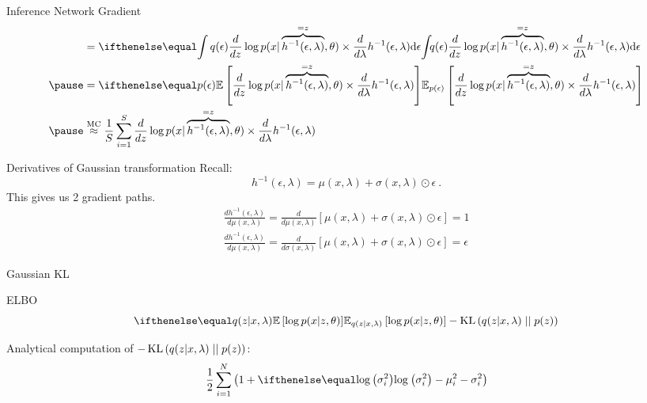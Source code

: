 \documentclass[14pt]{beamer}
\begin{document}
\begin{frame}{Inference Network Gradient}
\begin{equation*}
\begin{aligned}
&= \intl{q(\epsilon) \frac{d}{dz} \log p(x| \overbrace{h^{-1}(\epsilon, \lambda)}^{=z}, \theta) \times \frac{d}{d\lambda} h^{-1}(\epsilon, \lambda)}{\epsilon}  \\ \pause
&= \E[p(\epsilon)]{\frac{d}{dz} \log p(x| \overbrace{h^{-1}(\epsilon, \lambda)}^{=z}, \theta)\times \frac{d}{d\lambda} h^{-1}(\epsilon, \lambda)}\\ \pause
&\overset{\text{MC}}{\approx} \frac{1}{S}\sum_{i=1}^{S} \frac{d}{dz} \log p(x| \overbrace{h^{-1}(\epsilon, \lambda)}^{=z}, \theta) \times \frac{d}{d\lambda} h^{-1}(\epsilon, \lambda)
\end{aligned}
\end{equation*}
\end{frame}

\begin{frame}{Derivatives of Gaussian transformation}
Recall:
$$ h^{-1}(\epsilon, \lambda) = \mu(x,\lambda) + \sigma(x,\lambda) \odot \epsilon \ . $$
\pause
This gives us 2 gradient paths.
\pause
\begin{align*}
\frac{d h^{-1}(\epsilon, \lambda)}{d\mu(x,\lambda)} = \frac{d}{d\mu(x,\lambda)}\left[ \mu(x,\lambda) + \sigma(x,\lambda) \odot \epsilon \right] = 1 \\
\frac{d h^{-1}(\epsilon, \lambda)}{d\mu(x,\lambda)} = \frac{d}{d\sigma(x,\lambda)}\left[ \mu(x,\lambda) + \sigma(x,\lambda) \odot \epsilon \right] = \epsilon
\end{align*}
\end{frame}

\begin{frame}{Gaussian KL}
\begin{block}{ELBO}
\begin{equation*}
\E[q(z|x,\lambda)]{\log p(x|z,\theta)} - \KL{q(z|x,\lambda)}{p(z)}
\end{equation*}
\end{block}
\pause
Analytical computation of $ -\operatorname{KL}\left(q(z|x,\lambda)\mid\mid p(z)\right) $:
\begin{equation*}
\frac{1}{2}\sum_{i=1}^{N}\left(1 + \loga{\sigma^{2}_{i}} -
\mu^{2}_{i} - \sigma^{2}_{i} \right)
\end{equation*}
\end{frame}
\end{document}
